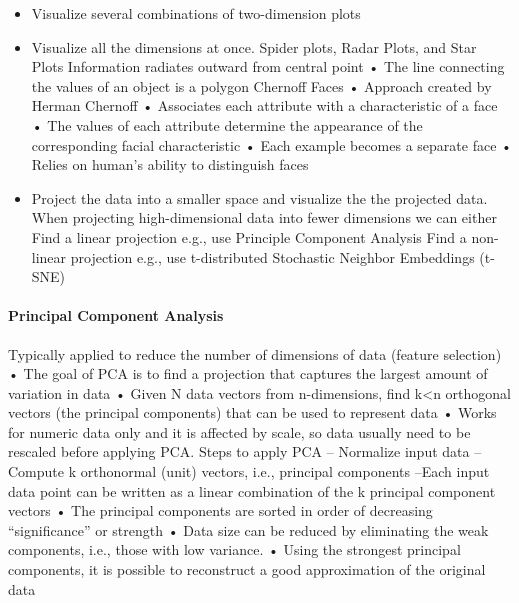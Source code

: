 \begin{itemize}
    \item Visualize several combinations of two-dimension plots
    \item Visualize all the dimensions at once. Spider plots, Radar Plots, and Star Plots Information radiates outward from central point
        • The line connecting the values of an object is a polygon
        Chernoff Faces
        • Approach created by Herman Chernoff
        • Associates each attribute with
        a characteristic of a face
        • The values of each attribute
        determine the appearance
        of the corresponding facial
        characteristic
        • Each example becomes a separate face
        • Relies on human’s ability to distinguish faces
    \item Project the data into a smaller space and visualize the the projected data. When projecting high-dimensional data
into fewer dimensions we can either
Find a linear projection
e.g., use Principle Component Analysis
Find a non-linear projection
e.g., use t-distributed Stochastic Neighbor Embeddings (t-SNE)
\end{itemize}

\paragraph*{Principal Component Analysis}
Typically applied to reduce the number of dimensions of data (feature selection)
• The goal of PCA is to find a projection that captures the largest amount of variation in data
• Given N data vectors from n-dimensions, find k<n orthogonal vectors (the principal
components) that can be used to represent data
• Works for numeric data only and it is affected by scale, so data usually need to be rescaled
before applying PCA. 
Steps to apply PCA
– Normalize input data
– Compute k orthonormal (unit) vectors, i.e., principal components
–Each input data point can be written as a linear combination
of the k principal component vectors
• The principal components are sorted in order of decreasing “significance” or strength
• Data size can be reduced by eliminating the weak components, i.e., those with low variance.
• Using the strongest principal components, it is possible to reconstruct
a good approximation of the original data

